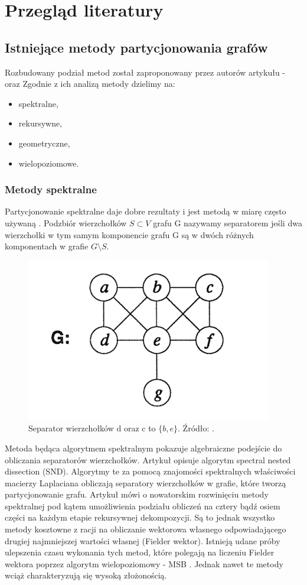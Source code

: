 \newpage


\section{Przegląd literatury}
\label{sec:literature}

\subsection{Istniejące metody partycjonowania grafów}

Rozbudowany podział metod został zaproponowany przez autorów artykułu - \cite{metis}
oraz \cite{1364754}
Zgodnie z ich analizą metody dzielimy na:
\begin{itemize}
    \item spektralne,
    \item rekursywne,
    \item geometryczne,
    \item wielopoziomowe.
\end{itemize}

\subsubsection{Metody spektralne}
Partycjonowanie spektralne daje dobre rezultaty i jest metodą w miarę często używaną
\cite{10.1137/0611030, 10.5555/147877.147902, improved_spectral}.
Podzbiór wierzchołków \(S \subset V\) grafu G nazywamy separatorem jeśli dwa wierzchołki w tym samym komponencie
grafu G są w dwóch różnych komponentach w grafie  \(G \setminus S\).

\begin{figure}[h]
    \centering
    \includegraphics[width=0.3\linewidth]{images/separator}
    \caption{Separator wierzchołków d oraz c to \(\{b, e\}\).
    Źródło: \cite{MiTeThVa93}.}
    \label{im:separator}
\end{figure}

Metoda \cite{10.1137/0611030} będąca algorytmem spektralnym pokazuje algebraiczne podejście do obliczania
separatorów wierzchołków.
Artykuł \cite{10.5555/147877.147902} opisuje algorytm spectral nested dissection (SND).
Algorytmy te za pomocą znajomości spektralnych właściwości macierzy Laplaciana obliczają separatory wierzchołków w grafie,
które tworzą partycjonowanie grafu.
Artykuł \cite{improved_spectral} mówi o nowatorskim rozwinięciu metody spektralnej pod kątem umożliwienia podziału
obliczeń na cztery bądź osiem części na każdym etapie rekursywnej dekompozycji.
Są to jednak wszystko metody kosztowne z racji na
obliczanie wektorowa własnego odpowiadającego drugiej najmniejszej wartości własnej (Fielder wektor).
Istnieją udane próby ulepszenia czasu wykonania tych metod, które polegają na liczeniu Fielder wektora poprzez
algorytm wielopoziomowy - MSB \cite{fast_multilevel}. Jednak nawet te metody wciąż charakteryzują się wysoką złożonością.


